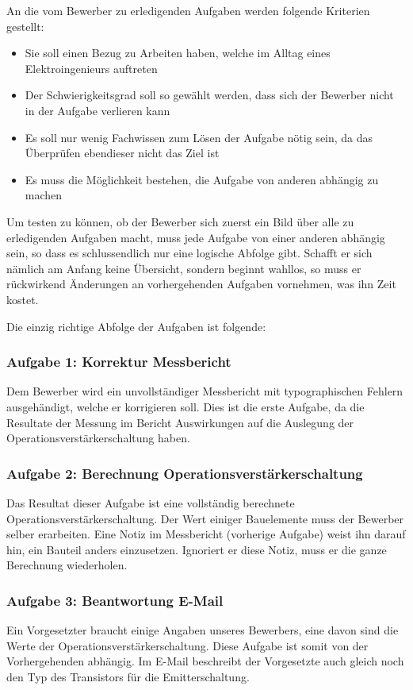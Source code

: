 An die vom Bewerber zu erledigenden Aufgaben werden folgende Kriterien gestellt:

\begin{itemize}
\item Sie soll einen Bezug zu Arbeiten haben, welche im Alltag eines Elektroingenieurs auftreten
\item Der Schwierigkeitsgrad soll so gewählt werden, dass sich der Bewerber nicht in der Aufgabe verlieren kann \item Es soll nur wenig Fachwissen zum Lösen der Aufgabe nötig sein, da das Überprüfen ebendieser nicht das Ziel ist
\item Es muss die Möglichkeit bestehen, die Aufgabe von anderen abhängig zu machen
\end{itemize}

Um testen zu können, ob der Bewerber sich zuerst ein Bild über alle zu erledigenden Aufgaben macht, muss jede Aufgabe von einer anderen abhängig sein, so dass es schlussendlich nur eine logische Abfolge gibt. Schafft er sich nämlich am Anfang keine Übersicht, sondern beginnt wahllos, so muss er rückwirkend Änderungen an vorhergehenden Aufgaben vornehmen, was ihn Zeit kostet.

Die einzig richtige Abfolge der Aufgaben ist folgende:

\subsubsection{Aufgabe 1: Korrektur Messbericht}
Dem Bewerber wird ein unvollständiger Messbericht mit typographischen Fehlern ausgehändigt, welche er korrigieren soll. %
Dies ist die erste Aufgabe, da die Resultate der Messung im Bericht Auswirkungen auf die Auslegung der Operationsverstärkerschaltung haben.

\subsubsection{Aufgabe 2: Berechnung Operationsverstärkerschaltung}
Das Resultat dieser Aufgabe ist eine vollständig berechnete Operationsverstärkerschaltung. Der Wert einiger Bauelemente muss der Bewerber selber erarbeiten. Eine Notiz im Messbericht (vorherige Aufgabe) weist ihn darauf hin, ein Bauteil anders einzusetzen. Ignoriert er diese Notiz, muss er die ganze Berechnung wiederholen.

\subsubsection{Aufgabe 3: Beantwortung E-Mail}
Ein Vorgesetzter braucht einige Angaben unseres Bewerbers, eine davon sind die Werte der Operationsverstärkerschaltung. Diese Aufgabe ist somit von der Vorhergehenden abhängig. Im E-Mail beschreibt der Vorgesetzte auch gleich noch den Typ des Transistors für die Emitterschaltung.


